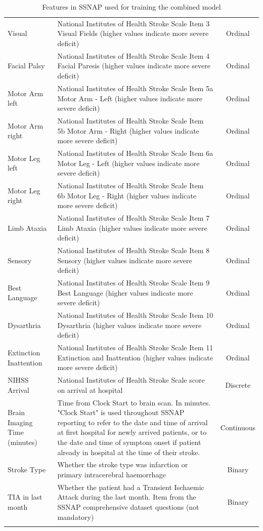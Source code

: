 \documentclass[12pt,a4paper, pdftex]{elsarticle}
\begin{document}
\begin{longtable}{|l|p{8.5cm}|c|}
        Visual & National Institutes of Health Stroke Scale Item 3 Visual Fields (higher values indicate more severe deficit) & Ordinal \\
        Facial Palsy & National Institutes of Health Stroke Scale Item 4 Facial Paresis (higher values indicate more severe deficit) & Ordinal \\
        Motor Arm left & National Institutes of Health Stroke Scale Item 5a Motor Arm - Left (higher values indicate more severe deficit) & Ordinal \\
        Motor Arm right & National Institutes of Health Stroke Scale Item 5b Motor Arm - Right (higher values indicate more severe deficit) & Ordinal \\
        Motor Leg left & National Institutes of Health Stroke Scale Item 6a Motor Leg - Left (higher values indicate more severe deficit) & Ordinal \\
        Motor Leg right & National Institutes of Health Stroke Scale Item 6b Motor Leg - Right (higher values indicate more severe deficit) & Ordinal \\
        Limb Ataxia & National Institutes of Health Stroke Scale Item 7 Limb Ataxia (higher values indicate more severe deficit) & Ordinal \\
        Sensory & National Institutes of Health Stroke Scale Item 8 Sensory (higher values indicate more severe deficit) & Ordinal \\
        Best Language & National Institutes of Health Stroke Scale Item 9 Best Language (higher values indicate more severe deficit) & Ordinal \\
        Dysarthria & National Institutes of Health Stroke Scale Item 10 Dysarthria (higher values indicate more severe deficit) & Ordinal \\
        Extinction Inattention & National Institutes of Health Stroke Scale Item 11 Extinction and Inattention (higher values indicate more severe deficit) & Ordinal \\
        NIHSS Arrival & National Institutes of Health Stroke Scale score on arrival at hospital & Discrete \\
        Brain Imaging Time (minutes) & Time from Clock Start to brain scan. In minutes. "Clock Start" is used throughout SSNAP reporting to refer to the date and time of arrival at first hospital for newly arrived patients, or to the date and time of symptom onset if patient already in hospital at the time of their stroke. & Continuous \\
        Stroke Type & Whether the stroke type was infarction or primary intracerebral haemorrhage & Binary \\
        TIA in last month & Whether the patient had a Transient Ischaemic Attack during the last month. Item from the SSNAP comprehensive dataset questions (not mandatory) & Binary \\
        \hline
        \caption{Features in SSNAP used for training the combined model}
        \label{tab:S1}       
        \end{longtable}
\end{document}
